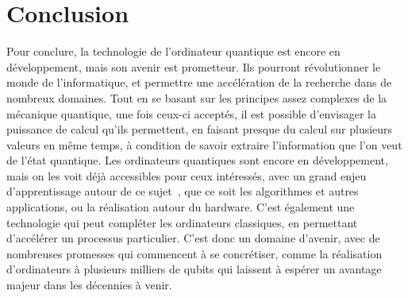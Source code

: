 \chapter{Conclusion}\label{ch:conclusion}

Pour conclure, la technologie de l'ordinateur quantique est encore en
développement, mais son avenir est prometteur.
Ils pourront révolutionner le monde de l'informatique, et permettre une
accélération de la recherche dans de nombreux domaines.
Tout en se basant sur les principes assez complexes de la mécanique quantique,
une fois ceux-ci acceptés, il est possible d'envisager la puissance de calcul
qu'ils permettent, en faisant presque du calcul sur plusieurs valeurs en même
temps, à condition de savoir extraire l'information que l'on veut de l'état
quantique.
Les ordinateurs quantiques sont encore en développement, mais on les voit déjà
accessibles pour ceux intéressés, avec un grand enjeu d'apprentissage
autour de ce sujet~\cite{qiskit-anal}, que ce soit les algorithmes et autres applications, ou
la réalisation autour du hardware.
C'est également une technologie qui peut compléter les ordinateurs classiques,
en permettant d'accélérer un processus particulier.
C'est donc un domaine d'avenir, avec de nombreuses promesses qui commencent à
se concrétiser, comme la réalisation d'ordinateurs à plusieurs milliers de
qubits qui laissent à espérer un avantage majeur dans les décennies à venir.
